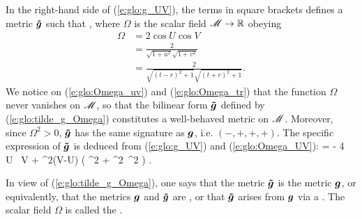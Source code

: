 In the right-hand side of (\ref{e:glo:g_UV}),
the terms in square brackets defines a metric
$\bm{\tilde{g}}$ such that
\be \label{e:glo:tilde_g_Omega}
     ,
\ee
where $\Omega$ is the scalar field $\mathscr{M} \rightarrow \mathbb{R}$ obeying
\begin{subequations}
\begin{align}
    \Omega & =  2 \cos U \cos V \label{e:glo:Omega_UV} \\
           & =  \frac{2}{\sqrt{1+u^2}\sqrt{1+v^2}} \label{e:glo:Omega_uv}\\
           & =  \frac{2}{\sqrt{(t-r)^2+1}\sqrt{(t+r)^2+1}} . \label{e:glo:Omega_tr}
\end{align}
\end{subequations}
We notice on (\ref{e:glo:Omega_uv}) and (\ref{e:glo:Omega_tr}) that the function
$\Omega$ never vanishes on $\mathscr{M}$, so that the bilinear form $\bm{\tilde{g}}$ defined by
(\ref{e:glo:tilde_g_Omega}) constitutes a well-behaved metric on $\mathscr{M}$.
Moreover, since $\Omega^2 > 0$, $\bm{\tilde{g}}$ has the same signature as
$\bm{g}$, i.e. $(-,+,+,+)$.
The specific expression of $\bm{\tilde{g}}$ is deduced from (\ref{e:glo:g_UV})
and (\ref{e:glo:Omega_UV}):
\be \label{e:glo:tg_UV}
     =  - 4 \, \dd U \, \dd V
        + \sin^2(V-U) \left(  \dd\th^2 + \sin^2\th \, \dd\ph^2 \right) .
\ee

In view of (\ref{e:glo:tilde_g_Omega}), one says that the metric $\bm{\tilde{g}}$
is  the metric $\bm{g}$, or equivalently,
that the metrics $\bm{g}$ and $\bm{\tilde{g}}$ are
,
or that $\bm{\tilde{g}}$ arises from $\bm{g}$ via a
.
The scalar field $\Omega$ is called the .

